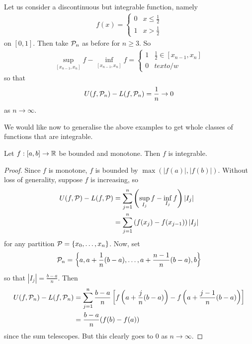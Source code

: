 \documentclass{../../template/note}
\begin{document}
    \begin{example*}
        Let us consider a discontinuous but integrable function, namely
        \begin{align*}
            f(x) = \begin{cases}
                0 & x \leq \frac 1 2 \\
                1 & x > \frac 1 2
            \end{cases}
        \end{align*}
        on \([0, 1]\). Then take \(\mathcal{P}_n\) as before for \(n \geq 3\). So
        \begin{align*}
            \sup_{[x_{n-1},x_n]}f - \inf_{[x_{n-1},x_n]}f = \begin{cases}
                1 & \frac 1 2 \in [x_{n-1}, x_n] \\
                0 & text{o/w}
            \end{cases}
        \end{align*}
        so that
        \begin{align*}
            U(f, \mathcal{P}_n) - L(f, \mathcal{P}_n) = \frac 1 n \to 0
        \end{align*}
        as \(n \to \infty\).
    \end{example*}
    
    We would like now to generalise the above examples to get whole classes of functions that are integrable.

    \begin{proposition}
        Let \(f: [a, b] \to \mathbb R\) be bounded and monotone. Then \(f\) is integrable.
    \end{proposition}

    
    \begin{proof}
        Since \(f\) is monotone, \(f\) is bounded by \(\max\left(|f(a)|, |f(b)|\right)\). Without loss of generality, suppose \(f\) is increasing, so
        \begin{align*}
            U(f, \mathcal{P}) - L(f, \mathcal{P}) &= \sum_{j=1}^n \left(\sup_{I_j} f - \inf_{I_j} f\right)|I_j| \\
            &= \sum_{j=1}^n \left(f(x_j)-f(x_{j-1})\right)|I_j|
        \end{align*}
        for any partition \(\mathcal{P} = \{x_0, \dots, x_n\}\). Now, set
        \begin{align*}
            \mathcal{P}_n = \left\{a, a + \frac 1 n (b-a), \dots, a + \frac{n-1}{n}(b-a), b\right\}
        \end{align*}
        so that \(|I_j| = \frac{b-a}{n}\). Then
        \begin{align*}
            U(f, \mathcal{P}_n) - L(f, \mathcal{P}_n) &= \sum_{j=1}^n \frac{b-a}{n} \left[f\left(a + \frac j n (b-a)\right) - f\left(a + \frac{j-1} n (b-a)\right)\right] \\
            &= \frac{b-a}{n}(f(b)-f(a))
        \end{align*}
        since the sum telescopes. But this clearly goes to 0 as \(n \to \infty\).
    \end{proof}
\end{document}
